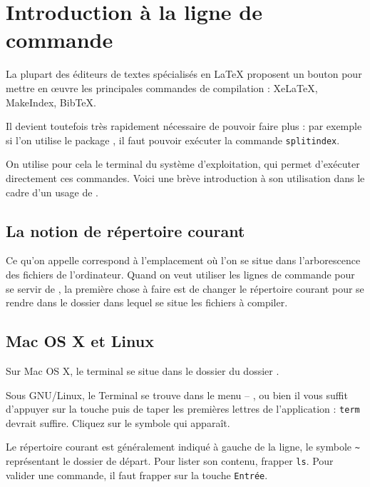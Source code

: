 \chapter{Introduction à la ligne de commande}\label{terminal}

\begin{intro}
La plupart des éditeurs de textes spécialisés en LaTeX  proposent un bouton pour mettre en œuvre les principales commandes de compilation :  XeLaTeX, MakeIndex, BibTeX.

Il devient toutefois très rapidement nécessaire de pouvoir faire plus : par exemple si l’on utilise le package , il faut pouvoir  exécuter la commande \verb|splitindex|.

On utilise pour cela le terminal du système d'exploitation, qui permet d'exécuter directement ces commandes. Voici une brève introduction à son utilisation dans le cadre d'un usage de \XeLaTeX.
\end{intro}

\section{La notion de répertoire courant}\label{repcourant}

Ce qu'on appelle  correspond à l'emplacement où l'on se situe dans l'arborescence des fichiers de l'ordinateur. Quand on veut utiliser les lignes de commande pour se servir de \XeLaTeX, la première chose à faire est de changer le répertoire courant pour se rendre dans le dossier dans lequel se situe les fichiers à compiler.

\section{Mac OS X et Linux}

Sur Mac OS X, le terminal se situe dans le dossier  du dossier . 

Sous GNU/Linux, le Terminal se trouve dans le menu  – 
, ou bien il vous suffit d'appuyer sur la touche  puis de taper les premières lettres de l'application : \verb|term| devrait suffire. Cliquez sur le symbole qui apparaît.

Le répertoire courant est généralement indiqué à gauche de la ligne, le symbole  \verb|~|  représentant le dossier de départ. Pour lister son contenu, frapper \verb|ls|. Pour valider une commande, il faut frapper sur la touche \verb|Entrée|.

